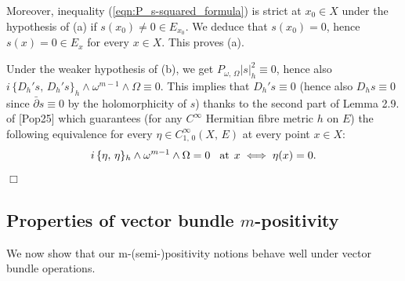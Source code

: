 \documentclass[12pt]{article}
\begin{document}
    Moreover, inequality (\ref{eqn:P_s-squared_formula}) is strict at $x_0\in X$ under the hypothesis of (a) if $s(x_0)\neq 0\in E_{x_0}$. We deduce that $s(x_0)=0$, hence $s(x)=0\in E_x$ for every $x\in X$. This proves (a).

    Under the weaker hypothesis of (b), we get $P_{\omega,\,\Omega}|s|^2_h\equiv 0$, hence also $i\,\{D_h's,\,D_h's\}_h\wedge\omega^{m-1}\wedge\Omega \equiv 0$. This implies that $D_h's \equiv 0$ (hence also $D_hs \equiv 0$ since $\bar\partial s\equiv 0$ by the holomorphicity of $s$) thanks to the second part of Lemma 2.9. of [Pop25] which guarantees (for any $C^\infty$ Hermitian fibre metric $h$ on $E$) the following equivalence for every $\eta\in C^\infty_{1,\,0}(X,\,E)$ at every point $x\in X$: \begin{eqnarray*}i\,\{\eta,\,\eta\}_h\wedge\omega^{m-1}\wedge\Omega = 0 \hspace{2ex}\mbox{at}\hspace{1ex} x \iff \eta(x)=0.\end{eqnarray*} \hfill $\Box$
    

\subsection{Properties of vector bundle $m$-positivity}\label{subsection:prop_m-pos_operations}

We now show that our m-(semi-)positivity notions behave well under vector bundle operations.
\end{document}
